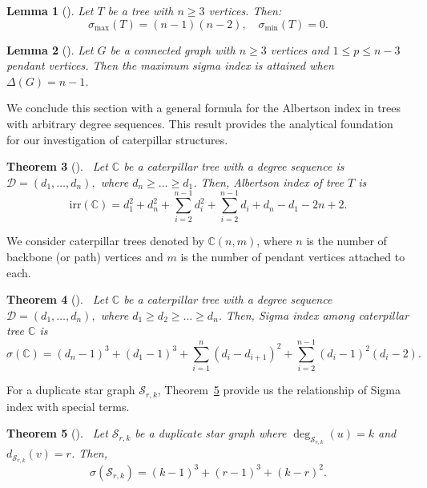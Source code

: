 \documentclass[12pt, a4paper]{article}
\theoremstyle{plain}  %
\newtheorem{theorem}{Theorem}[section]
\newtheorem{lemma}[theorem]{Lemma}
\theoremstyle{definition}  %
\newcommand{\CC}{\mathbb{C}}
\begin{document}
\begin{lemma}[\cite{gutman2018inverse}]
Let $ T $ be a tree with $ n \geq 3 $ vertices. Then:
\[
\sigma_{\max}(T) = (n - 1)(n - 2), \quad \sigma_{\min}(T) = 0.
\]
\end{lemma}

\begin{lemma}[\cite{yang2023sigma}]
Let $ G $ be a connected graph with $ n \geq 3 $ vertices and $ 1 \leq p \leq n - 3 $ pendant vertices. Then the maximum sigma index is attained when $ \Delta(G) = n - 1 $.
\end{lemma}

We conclude this section with a general formula for the Albertson index in trees with arbitrary degree sequences. This result provides the analytical foundation for our investigation of caterpillar structures.
\begin{theorem}[\cite{HamoudwithDuaa}]~\label{mainthm}
Let $\CC$ be a caterpillar tree with a degree sequence is $\mathscr{D}=(d_1,\dots,d_n),$ where $d_n\geqslant \dots \geqslant d_1$.
Then, Albertson index of tree $T$ is
    \[
    \mathrm{irr}(\CC)=d_1^2+d_n^2+\sum_{i=2}^{n-1} d_i^2+\sum_{i=2}^{n-1} d_i+d_n - d_1-2n+2.
    \]
\end{theorem}
We consider caterpillar trees denoted by $\CC(n, m)$, where $n$ is the number of backbone (or path) vertices and $m$ is the number of pendant vertices attached to each.  

\begin{theorem}[\cite{HamoudwithDuaa}]~\label{basic01sigma}
Let $\CC$ be a caterpillar tree with a degree sequence
$\mathscr{D}=(d_1,\dots,d_n),$ where $d_1\geqslant d_2\geqslant \dots
\geqslant d_n$. Then, Sigma index among caterpillar tree $\CC$ is
\[
\sigma(\CC)=(d_n-1)^3+(d_1-1)^3+\sum_{i=1}^{n}(d_i-d_{i+1})^2+\sum_{i=2}^{n-1}(d_i-1)^2(d_i-2).
\]
\end{theorem}
For a duplicate star graph $\mathcal{S}_{r,k}$, Theorem~\ref{thmpirlllkj} provide us the relationship of Sigma index with special terms.
\begin{theorem}[\cite{gutman2018inverse}]~\label{thmpirlllkj}
Let $\mathcal{S}_{r,k}$ be a duplicate star graph where $\deg_{\mathcal{S}_{r,k}}(u)=k$ and $d_{\mathcal{S}_{r,k}}(v)=r$. Then, 
\[
\sigma(\mathcal{S}_{r,k})=(k-1)^3+(r-1)^3+(k-r)^2.
\]
\end{theorem}
\end{document}
